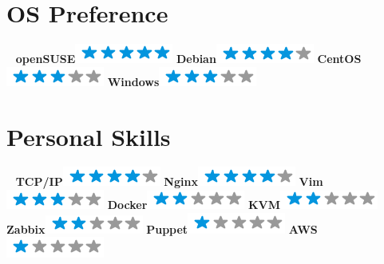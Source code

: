 \documentclass[]{friggeri-cv}
\begin{document}
\begin{aside}
  \section{OS Preference}
  ~
    \textbf{openSUSE}\includegraphics[scale=0.40]{img/5stars.png}
    \textbf{Debian}\includegraphics[scale=0.40]{img/4stars.png}
    \textbf{CentOS}\includegraphics[scale=0.40]{img/3stars.png}
    \textbf{Windows}\includegraphics[scale=0.40]{img/3stars.png}
  ~
  \section{Personal Skills}
  ~
  \textbf{TCP/IP}\includegraphics[scale=0.40]{img/4stars.png}
  \textbf{Nginx}\includegraphics[scale=0.40]{img/4stars.png}
  \textbf{Vim}\includegraphics[scale=0.40]{img/3stars.png}
  \textbf{Docker}\includegraphics[scale=0.40]{img/2stars.png}
  \textbf{KVM}\includegraphics[scale=0.40]{img/2stars.png}
  \textbf{Zabbix}\includegraphics[scale=0.40]{img/2stars.png}
  \textbf{Puppet}\includegraphics[scale=0.40]{img/1stars.png}
  \textbf{AWS}\includegraphics[scale=0.40]{img/1stars.png}
  ~
\end{aside}
\end{document}
